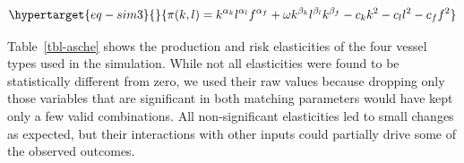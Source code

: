 \documentclass[
  letterpaper,
  DIV=11,
  numbers=noendperiod]{scrartcl}
\theoremstyle{plain}
\theoremstyle{plain}
\theoremstyle{remark}
\begin{document}
\begin{equation}\protect\hypertarget{eq-sim3}{}{
\pi(k,l)=k^{\alpha_k}l^{\alpha_l}f^{\alpha_f}+\omega k^{\beta_k}l^{\beta_l}k^{\beta_f}-c_kk^2-c_ll^2-c_ff^2
}\label{eq-sim3}\end{equation}

Table~\ref{tbl-asche} shows the production and risk elasticities of the
four vessel types used in the simulation. While not all elasticities
were found to be statistically different from zero, we used their raw
values because dropping only those variables that are significant in
both matching parameters would have kept only a few valid combinations.
All non-significant elasticities led to small changes as expected, but
their interactions with other inputs could partially drive some of the
observed outcomes.

\hypertarget{tbl-asche}{}
\end{document}
